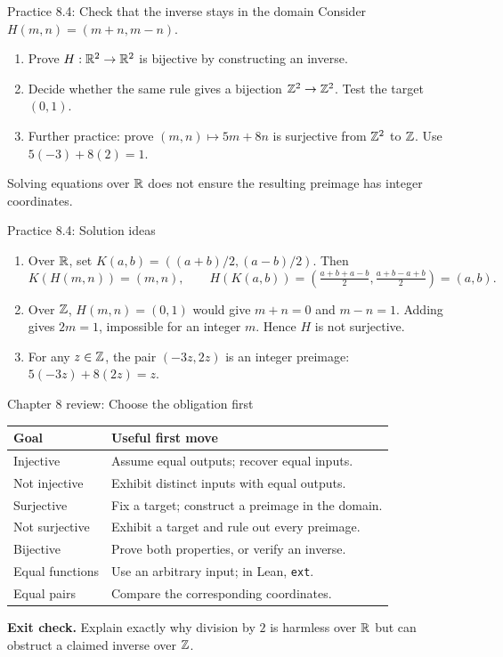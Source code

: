 \begin{frame}{Practice 8.4: Check that the inverse stays in the domain}
Consider $H(m,n)=(m+n,m-n)$.
\begin{enumerate}
\item Prove $H:\mathbb{R}^2\to\mathbb{R}^2$ is bijective by constructing an inverse.
\item Decide whether the same rule gives a bijection $\mathbb{Z}^2\to\mathbb{Z}^2$.
Test the target $(0,1)$.
\item Further practice: prove $(m,n)\mapsto5m+8n$ is surjective from $\mathbb{Z}^2$ to $\mathbb{Z}$.
Use $5(-3)+8(2)=1$.
\end{enumerate}
Solving equations over $\mathbb{R}$ does not ensure the resulting preimage has integer coordinates.
\end{frame}

\begin{frame}{Practice 8.4: Solution ideas}
\begin{enumerate}
\item Over $\mathbb{R}$, set $K(a,b)=((a+b)/2,(a-b)/2)$. Then
\[
 K(H(m,n))=(m,n),\qquad
 H(K(a,b))=\left(\tfrac{a+b+a-b}{2},\tfrac{a+b-a+b}{2}\right)=(a,b).
\]
\item Over $\mathbb{Z}$, $H(m,n)=(0,1)$ would give $m+n=0$ and $m-n=1$.
Adding gives $2m=1$, impossible for an integer $m$. Hence $H$ is not surjective.
\item For any $z\in\mathbb{Z}$, the pair $(-3z,2z)$ is an integer preimage:
$5(-3z)+8(2z)=z$.
\end{enumerate}
\end{frame}

\begin{frame}{Chapter 8 review: Choose the obligation first}
\begin{center}
\begin{tabular}{p{}p{}}
\toprule
Goal & Useful first move\\\midrule
Injective & Assume equal outputs; recover equal inputs.\\
Not injective & Exhibit distinct inputs with equal outputs.\\
Surjective & Fix a target; construct a preimage in the domain.\\
Not surjective & Exhibit a target and rule out every preimage.\\
Bijective & Prove both properties, or verify an inverse.\\
Equal functions & Use an arbitrary input; in Lean, \texttt{ext}.\\
Equal pairs & Compare the corresponding coordinates.\\
\bottomrule
\end{tabular}
\end{center}
\textbf{Exit check.} Explain exactly why division by $2$ is harmless over $\mathbb{R}$
but can obstruct a claimed inverse over $\mathbb{Z}$.
\end{frame}

